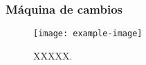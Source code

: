\subsubsection{Máquina de cambios}

    \lipsum[1]

    \begin{figure}[h]
        \centering
        \texttt{[image: example-image]}
        \centering\caption{XXXXX.}
        \label{fig:cambios_1}
    \end{figure}

    \lipsum[1]